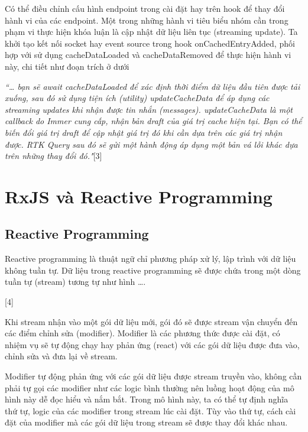 Có thể điều chỉnh cấu hình endpoint trong cài đặt hay trên hook để thay đổi hành vi của các endpoint.
Một trong những hành vi tiêu biểu nhóm cần trong phạm vi thực hiện khóa luận là cập nhật dữ liệu liên tục (streaming update).
Ta khởi tạo kết nối socket hay event source trong hook onCachedEntryAdded, phối hợp với sử dụng cacheDataLoaded và cacheDataRemoved để thực hiện hành vi này, chi tiết như đoạn trích ở dưới 
\par

\textit{“… bạn sẽ await cacheDataLoaded để xác định thời điểm dữ liệu đầu tiên được tải xuống, sau đó sử dụng tiện ích (utility) updateCacheData để áp dụng các streaming updates khi nhận được tin nhắn (messages).
updateCacheData là một callback do Immer cung cấp, nhận bản draft của giá trị cache hiện tại.
Bạn có thể biến đổi giá trị draft để cập nhật giá trị đó khi cần dựa trên các giá trị nhận được. 
RTK Query sau đó sẽ gửi một hành động áp dụng một bản vá lỗi khác dựa trên những thay đổi đó."}[3]

\section{RxJS và Reactive Programming}

\subsection{Reactive Programming}

\tab Reactive programming là thuật ngữ chỉ phương pháp xử lý, lập trình với dữ liệu không tuần tự.
Dữ liệu trong reactive programming sẽ được chứa trong một dòng tuần tự (stream) tương tự như hình …. 

[4]

\tab Khi stream nhận vào một gói dữ liệu mới, gói đó sẽ được stream vận chuyển đến các điểm chỉnh sửa (modifier).
Modifier là các phương thức được cài đặt, có nhiệm vụ sẽ tự động chạy hay phản ứng (react) với các gói dữ liệu được đưa vào, chỉnh sửa và đưa lại về stream.
\par

Modifier tự động phản ứng với các gói dữ liệu được stream truyền vào, không cần phải tự gọi các modifier như các logic bình thường nên luồng hoạt động của mô hình này dễ đọc hiểu và nắm bắt.
Trong mô hình này, ta có thể tự định nghĩa thứ tự, logic của các modifier trong stream lúc cài đặt.
Tùy vào thứ tự, cách cài đặt của modifier mà các gói dữ liệu trong stream sẽ được thay đổi khác nhau.

